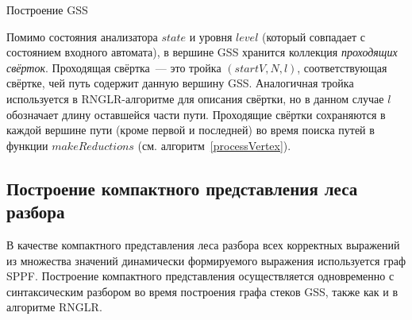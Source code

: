 \begin{algorithm}[H]
\begin{algorithmic}[1]
\caption{Построение GSS}
\label{gss_construction}
   
  \Else
    \EndFor
  \EndIf
\EndFunction

    \EndIf
      \EndFor
    \EndIf
  \EndIf
\EndFunction
\end{algorithmic}
\end{algorithm}

Помимо состояния анализатора $state$ и уровня $level$ (который совпадает с состоянием входного автомата), в вершине GSS хранится коллекция \emph{проходящих свёрток}. Проходящая свёртка~--- это тройка $(startV, N, l)$, соответствующая свёртке, чей путь содержит данную вершину GSS. Аналогичная тройка используется в RNGLR-алгоритме для описания свёртки, но в данном случае $l$ обозначает длину оставшейся части пути. Проходящие свёртки сохраняются в каждой вершине пути (кроме первой и последней) во время поиска путей в функции $makeReductions$ (см. алгоритм~\ref{processVertex}).

\subsection{Построение компактного представления леса разбора}
В качестве компактного представления леса разбора всех корректных выражений из множества значений динамически формируемого выражения используется граф SPPF. Построение компактного представления осуществляется одновременно с синтаксическим разбором во время построения графа стеков GSS, также как и в алгоритме RNGLR.

